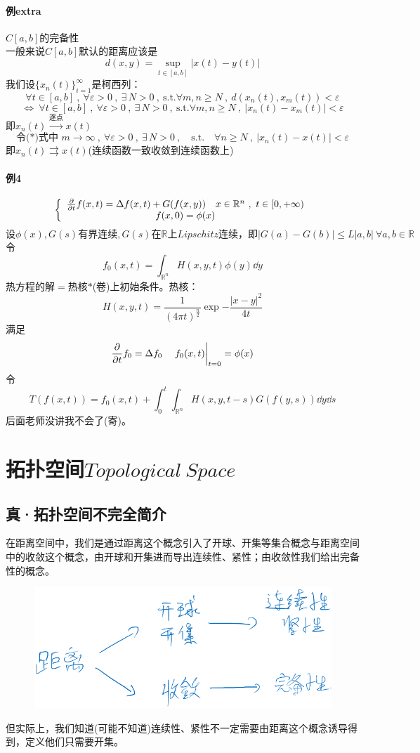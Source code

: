 \paragraph*{例extra} \quad $C[a,b]$的完备性 \\
一般来说$C[a,b]$默认的距离应该是
\[d(x,y)=\mathop {\text{sup}}\limits_{t \in [a,b]}|x(t)-y(t)|\]
我们设$\{x_n(t)\}_{i=1}^{\infty}$是柯西列：
\[\forall t \in [a,b] \ , \ \forall \varepsilon>0 \ , \ \exists \, N>0 \ , \ \text{s.t.} \forall m,n \geq N \ , \ d(x_n(t),x_m(t))<\varepsilon\]
\[\Leftrightarrow \ \forall t \in [a,b] \ , \ \forall \varepsilon>0 \ , \ \exists \, N>0 \ , \ \text{s.t.} \forall m,n \geq N \ , \ |x_n(t)-x_m(t)|<\varepsilon \tag{*}\]
即$x_n(t) \xrightarrow{\text{逐点}} x(t)$
\[\text{令(*)式中 }m \to \infty \ , \ \forall \varepsilon>0 \ , \ \exists \, N>0 \ , \quad \text{s.t.} \quad \forall n \geq N \ , \ |x_n(t)-x(t)|<\varepsilon\]
即$x_n(t) \rightrightarrows x(t)$(连续函数一致收敛到连续函数上)
\paragraph*{例4}
\[\left\{
\begin{array}{c}
    \pdv{}{t}f(x,t)=\Delta f(x,t)+G(f(x,y)) \quad x \in \mathbb{R}^n \ , \ t \in [0,+\infty) \\
    f(x,0)=\phi(x)
\end{array}
\right.\]
\[\text{设}\phi(x),G(s)\text{有界连续},G(s)\text{在}\mathbb{R}\text{上} 𝐿𝑖𝑝𝑠𝑐ℎ𝑖𝑡𝑧 \text{连续，即}|G(a)-G(b)| \leq L|a,b| \ \forall a,b \in \mathbb{R}\]
令
\[f_0(x,t)=\int_{\mathbb{R}^n}H(x,y,t)\phi(y)\dd y\]
热方程的解$=$热核$*$(卷)上初始条件。热核：
\[H(x,y,t)=\frac{1}{(4 \pi t)^{\frac{n}{2}}}\exp{-\frac{|x-y|^2}{4t}}\]
满足
\[\pdv{}{t}f_0=\Delta f_0 \quad \eval{f_0(x,t)}_{t=0}=\phi(x)\]
令
\[T(f(x,t))=f_0(x,t)+\int_0^t\int_{\mathbb{R}^n}H(x,y,t-s)G(f(y,s))\dd y\dd s\]
后面老师没讲我不会了(寄)。

\section{拓扑空间$Topological \ Space$} \label{topo}
\subsection{真·拓扑空间不完全简介}
在距离空间中，我们是通过距离这个概念引入了开球、开集等集合概念与距离空间中的收敛这个概念，由开球和开集进而导出连续性、紧性；由收敛性我们给出完备性的概念。
\begin{figure}[htbp]
    \center
    \includegraphics[scale=0.4]{./fig/2.2.1.png}
\end{figure}
但实际上，我们知道(可能不知道)连续性、紧性不一定需要由距离这个概念诱导得到，定义他们只需要开集。

